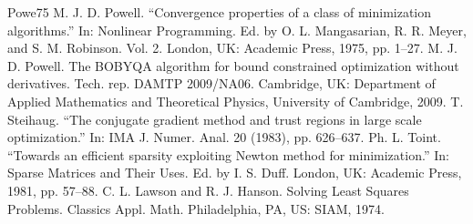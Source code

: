 \documentclass[letterpaper,10pt,english]{sphinxmanual}
\begin{document}
\begin{sphinxthebibliography}{Powe75}
\sphinxAtStartPar
M. J. D. Powell. “Convergence properties of a class of minimization
algorithms.” In: Nonlinear Programming. Ed. by O. L. Mangasarian, R. R.
Meyer, and S. M. Robinson. Vol. 2. London, UK: Academic Press, 1975, pp.
1–27.
\sphinxAtStartPar
M. J. D. Powell. The BOBYQA algorithm for bound constrained
optimization without derivatives. Tech. rep. DAMTP 2009/NA06. Cambridge, UK:
Department of Applied Mathematics and Theoretical Physics, University of
Cambridge, 2009.
\sphinxAtStartPar
T. Steihaug. “The conjugate gradient method and trust regions in
large scale optimization.” In: IMA J. Numer. Anal. 20 (1983), pp. 626–637.
\sphinxAtStartPar
Ph. L. Toint. “Towards an efficient sparsity exploiting Newton
method for minimization.” In: Sparse Matrices and Their Uses. Ed. by I. S.
Duff. London, UK: Academic Press, 1981, pp. 57–88.
\sphinxAtStartPar
C. L. Lawson and R. J. Hanson. Solving Least Squares Problems.
Classics Appl. Math. Philadelphia, PA, US: SIAM, 1974.
\end{sphinxthebibliography}



\renewcommand{\indexname}{Index}
\printindex
\end{document}
